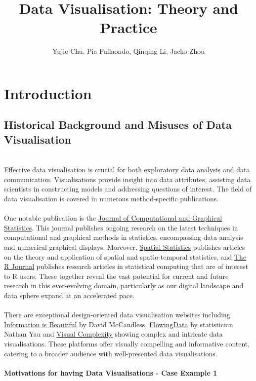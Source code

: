 \documentclass{article}\usepackage[]{graphicx}\usepackage[]{xcolor}
\title{Data Visualisation: Theory and Practice}
\author{Yujie Chu, Pia Fullaondo, Qinqing Li, Jacko Zhou}
\begin{document}
\maketitle 

\newpage
\tableofcontents

\newpage 

\section{Introduction}

\subsection{Historical Background and Misuses of Data Visualisation}
\\Effective data visualisation is crucial for both exploratory data analysis and data communication. Visualisations provide insight into data attributes, assisting data scientists in constructing models and addressing questions of interest. The field of data visualisation is covered in numerous method-specific publications.
\\
\\ One notable publication is the \href{https://www.tandfonline.com/journals/ucgs20}{Journal of Computational and Graphical Statistics}. This journal publishes ongoing research on the latest techniques in computational and graphical methods in statistics, encompassing data analysis and numerical graphical displays. Moreover, \href{https://www.sciencedirect.com/journal/spatial-statistics}{Spatial Statistics} publishes articles on the theory and application of spatial and spatio-temporal statistics, and \href{https://journal.r-project.org}{The R Journal} publishes research articles in statistical computing that are of interest to R users. These together reveal the vast potential for current and future research in this ever-evolving domain, particularly as our digital landscape and data sphere expand at an accelerated pace.
\\  
\\There are exceptional design-oriented data visualisation websites including \href{https://informationisbeautiful.net/}{Information is Beautiful} by David McCandless, \href{https://flowingdata.com/}{FlowingData} by statistician Nathan Yau and \href{http://www.visualcomplexity.com/vc/}{Visual Complexity} showing complex and intricate data visualisations. These platforms offer visually compelling and informative content, catering to a broader audience with well-presented data visualisations.
\\  
\\\textbf{Motivations for having Data Visualisations - Case Example 1}\\
\end{document}
